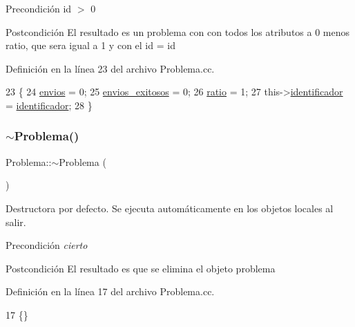 \begin{DoxyPrecond}{Precondición}
id $>$ 0 
\end{DoxyPrecond}
\begin{DoxyPostcond}{Postcondición}
El resultado es un problema con con todos los atributos a 0 menos ratio, que sera igual a 1 y con el id = id 
\end{DoxyPostcond}


Definición en la línea 23 del archivo Problema.\+cc.


\begin{DoxyCode}
23                                        \{
24     \mbox{\hyperlink{class_problema_aaef8dcb723fa829a052517a00aed003e}{envios}} = 0;
25     \mbox{\hyperlink{class_problema_ad8f0dfd65c2673395ad72ae9817cb7ae}{envios\_exitosos}} = 0;
26     \mbox{\hyperlink{class_problema_acc3d2ce24418ad68650108de4b603d99}{ratio}} = 1;
27     this->\mbox{\hyperlink{class_problema_ac59427a22875e6b6a35490628a220ba6}{identificador}} = \mbox{\hyperlink{class_problema_ac59427a22875e6b6a35490628a220ba6}{identificador}};
28 \}
\end{DoxyCode}
\mbox{\label{class_problema_a11dc802ebd9ccb5fbd801e2339c02ae2}} 
\subsubsection{\texorpdfstring{$\sim$\+Problema()}{~Problema()}}
{\footnotesize\ttfamily Problema\+::$\sim$\+Problema (\begin{DoxyParamCaption}{ }\end{DoxyParamCaption})}



Destructora por defecto. Se ejecuta automáticamente en los objetos locales al salir. 

\begin{DoxyPrecond}{Precondición}
{\itshape cierto} 
\end{DoxyPrecond}
\begin{DoxyPostcond}{Postcondición}
El resultado es que se elimina el objeto problema 
\end{DoxyPostcond}


Definición en la línea 17 del archivo Problema.\+cc.


\begin{DoxyCode}
17 \{\}
\end{DoxyCode}


